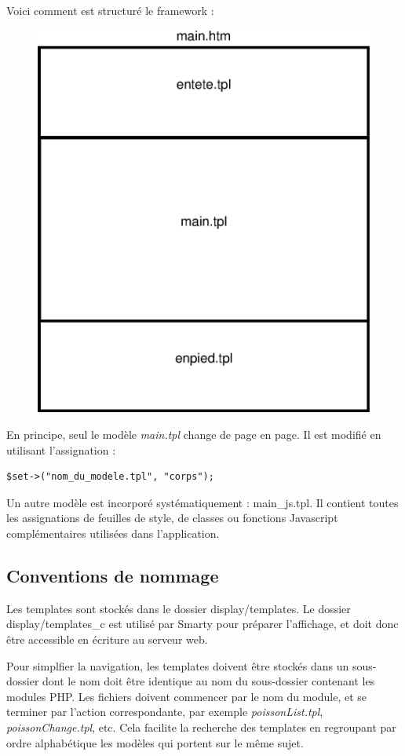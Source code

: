 Voici comment est structuré le framework :

\begin{figure}[H]
\centering
\includegraphics[width=0.7\linewidth]{dessin/templates}
\caption{}
\end{figure}

En principe, seul le modèle \textit{main.tpl} change de page en page. Il est modifié en utilisant l'assignation :
\begin{lstlisting}
$set->("nom_du_modele.tpl", "corps");
\end{lstlisting}

Un autre modèle est incorporé systématiquement : main\_js.tpl.  Il contient toutes les assignations de feuilles de style, de classes ou fonctions Javascript complémentaires utilisées dans l'application.


\subsection{Conventions de nommage}

Les templates sont stockés dans le dossier display/templates. Le dossier display/templates\_c est utilisé par Smarty pour préparer l'affichage, et doit donc être accessible en écriture au serveur web.

Pour simplfier la navigation, les templates doivent être stockés dans un sous-dossier dont le nom doit être identique au nom du sous-dossier contenant les modules PHP. Les fichiers doivent commencer par le nom du module, et se terminer par l'action correspondante, par exemple \textit{poissonList.tpl}, \textit{poissonChange.tpl}, etc. 
Cela facilite la recherche des templates en regroupant par ordre alphabétique les modèles qui portent sur le même sujet.

